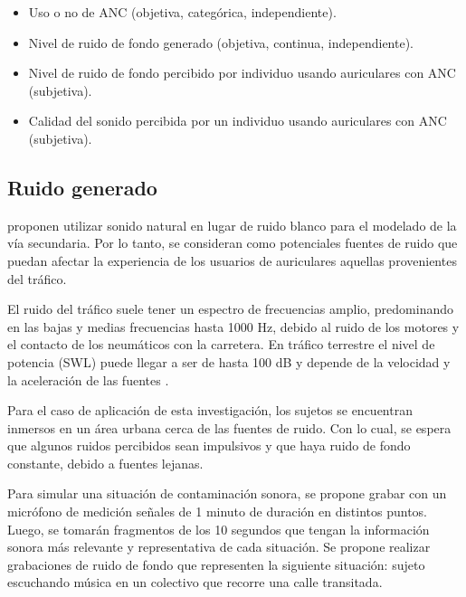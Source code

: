 \documentclass[a4paper,12pt]{article}
\begin{document}
\begin{itemize}[label=\textbullet]
    \item Uso o no de ANC (objetiva, categórica, independiente).

    \item Nivel de ruido de fondo generado (objetiva, continua, independiente).

    \item Nivel de ruido de fondo percibido por individuo usando auriculares con ANC (subjetiva).

    \item Calidad del sonido percibida por un individuo usando auriculares con ANC (subjetiva).
\end{itemize}

\subsection{Ruido generado}
\label{sec:generatedNoise}

\textcite[][3]{Kuo2018} proponen utilizar sonido natural en lugar de ruido blanco para el modelado de la vía secundaria.
Por lo tanto, se consideran como potenciales fuentes de ruido que puedan afectar la experiencia de los usuarios de auriculares aquellas provenientes del tráfico.

El ruido del tráfico suele tener un espectro de frecuencias amplio, predominando en las bajas y medias frecuencias hasta 1000 $\si{\hertz}$, debido al ruido de los motores y el contacto de los neumáticos con la carretera.
En tráfico terrestre el nivel de potencia (SWL) puede llegar a ser de hasta 100 \si{\deci \bel} y depende de la velocidad y la aceleración de las fuentes \parencite{Can2010}.

Para el caso de aplicación de esta investigación, los sujetos se encuentran inmersos en un área urbana cerca de las fuentes de ruido.
Con lo cual, se espera que algunos ruidos percibidos sean impulsivos y que haya ruido de fondo constante, debido a fuentes lejanas.

Para simular una situación de contaminación sonora, se propone grabar con un micrófono de medición señales de 1 minuto de duración en distintos puntos.
Luego, se tomarán fragmentos de los 10 segundos que tengan la información sonora más relevante y representativa de cada situación.
Se propone realizar grabaciones de ruido de fondo que representen la siguiente situación: sujeto escuchando música en un colectivo que recorre una calle transitada.
\end{document}

